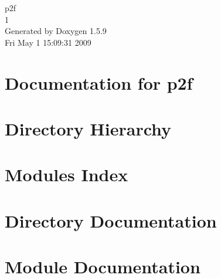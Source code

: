 \documentclass[a4paper]{book}
\begin{document}
\hypersetup{pageanchor=false}
\begin{titlepage}
\vspace*{7cm}
\begin{center}
{\Large p2f \\[1ex]\large 1 }\\
\vspace*{1cm}
{\large Generated by Doxygen 1.5.9}\\
\vspace*{0.5cm}
{\small Fri May 1 15:09:31 2009}\\
\end{center}
\end{titlepage}
\clearemptydoublepage
{}
\tableofcontents
\clearemptydoublepage
{}
\hypersetup{pageanchor=true}
\chapter{Documentation for p2f}
\label{index}\hypertarget{index}{}
\chapter{Directory Hierarchy}

\chapter{Modules Index}

\chapter{Directory Documentation}





\chapter{Module Documentation}


\printindex
\end{document}
